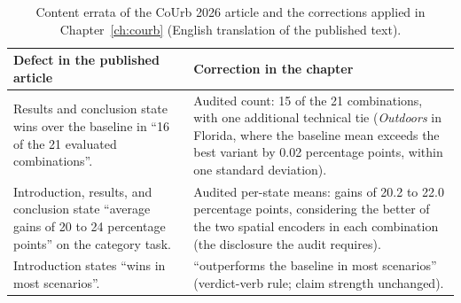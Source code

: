 \begin{table}[htb]
\caption{Content errata of the CoUrb 2026 article and the corrections applied in
Chapter~\ref{ch:courb} (English translation of the published text).}
\label{tab:apx:courb-errata}
\centering
\small
\begin{tabular}{@{}p{}p{}@{}}
\toprule
\textbf{Defect in the published article} & \textbf{Correction in the chapter} \\
\midrule
Results and conclusion state wins over the baseline in ``16 of the 21
evaluated combinations''. &
Audited count: 15 of the 21 combinations, with one additional technical tie
(\emph{Outdoors} in Florida, where the baseline mean exceeds the best variant by
0.02 percentage points, within one standard deviation). \\
\addlinespace
Introduction, results, and conclusion state ``average gains of 20 to 24
percentage points'' on the category task. &
Audited per-state means: gains of 20.2 to 22.0 percentage points, considering the
better of the two spatial encoders in each combination (the disclosure the audit
requires). \\
\addlinespace
Introduction states ``wins in most scenarios''. &
``outperforms the baseline in most scenarios'' (verdict-verb rule; claim
strength unchanged). \\
\bottomrule
\end{tabular}
\end{table}
